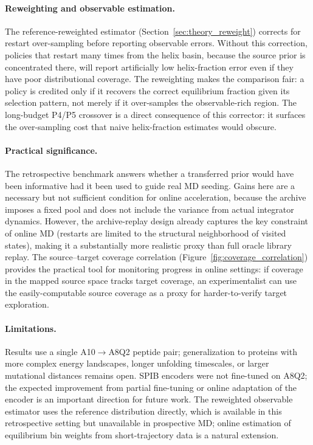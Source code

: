 \paragraph{Reweighting and observable estimation.}
The reference-reweighted estimator (Section~\ref{sec:theory_reweight}) corrects for restart over-sampling before reporting observable errors.
Without this correction, policies that restart many times from the helix basin, because the source prior is concentrated there, will report artificially low helix-fraction error even if they have poor distributional coverage.
The reweighting makes the comparison fair: a policy is credited only if it recovers the correct equilibrium fraction given its selection pattern, not merely if it over-samples the observable-rich region.
The long-budget P4/P5 crossover is a direct consequence of this corrector: it surfaces the over-sampling cost that naive helix-fraction estimates would obscure.

\paragraph{Practical significance.}
The retrospective benchmark answers whether a transferred prior would have been informative had it been used to guide real MD seeding.
Gains here are a necessary but not sufficient condition for online acceleration, because the archive imposes a fixed pool and does not include the variance from actual integrator dynamics.
However, the archive-replay design already captures the key constraint of online MD (restarts are limited to the structural neighborhood of visited states), making it a substantially more realistic proxy than full oracle library replay.
The source--target coverage correlation (Figure~\ref{fig:coverage_correlation}) provides the practical tool for monitoring progress in online settings: if coverage in the mapped source space tracks target coverage, an experimentalist can use the easily-computable source coverage as a proxy for harder-to-verify target exploration.

\paragraph{Limitations.}
Results use a single A10$\rightarrow$A8Q2 peptide pair; generalization to proteins with more complex energy landscapes, longer unfolding timescales, or larger mutational distances remains open.
SPIB encoders were not fine-tuned on A8Q2; the expected improvement from partial fine-tuning or online adaptation of the encoder is an important direction for future work.
The reweighted observable estimator uses the reference distribution directly, which is available in this retrospective setting but unavailable in prospective MD; online estimation of equilibrium bin weights from short-trajectory data is a natural extension.

